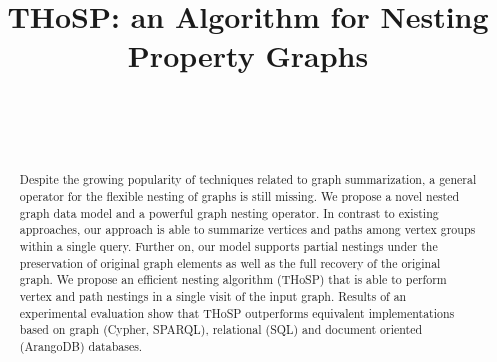 


\begin{abstract}
  Despite the growing popularity of techniques related to graph summarization, a general operator for the flexible nesting of graphs is still missing.
  We propose a novel nested graph data model and a powerful graph nesting operator. In contrast to existing approaches, our approach is able to summarize vertices and paths among vertex groups within a single query. Further on, our model supports partial nestings under the preservation of original graph elements as well as the full recovery of the original graph. We propose an efficient nesting algorithm (THoSP) that is able to perform vertex and path nestings in a single visit of the input graph. Results of an experimental evaluation show that THoSP outperforms equivalent implementations based on graph (Cypher, SPARQL), relational (SQL) and document oriented (ArangoDB) databases.
\end{abstract}


\title{THoSP: an Algorithm for Nesting Property Graphs}


\renewcommand{\shortauthors}{[Authors]}

\author{\ }
\affiliation{\institution{\ }}

\author{\ }
\affiliation{\institution{\ }}


